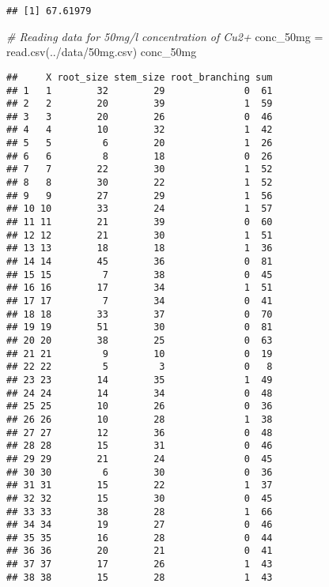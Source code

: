 \documentclass[
]{article}
\newenvironment{Shaded}{\begin{snugshade}}{\end{snugshade}}
\newcommand{\CommentTok}[1]{\textcolor[rgb]{0.56,0.35,0.01}{\textit{#1}}}
\newcommand{\FunctionTok}[1]{\textcolor[rgb]{0.00,0.00,0.00}{#1}}
\newcommand{\NormalTok}[1]{#1}
\newcommand{\OtherTok}[1]{\textcolor[rgb]{0.56,0.35,0.01}{#1}}
\newcommand{\StringTok}[1]{\textcolor[rgb]{0.31,0.60,0.02}{#1}}
\begin{document}
\begin{verbatim}
## [1] 67.61979
\end{verbatim}

\begin{Shaded}
\begin{Highlighting}[]
\CommentTok{\# Reading data for 50mg/l concentration of Cu2+}
\NormalTok{conc\_50mg }\OtherTok{=} \FunctionTok{read.csv}\NormalTok{(}\StringTok{\textquotesingle{}../data/50mg.csv\textquotesingle{}}\NormalTok{)}
\NormalTok{conc\_50mg}
\end{Highlighting}
\end{Shaded}

\begin{verbatim}
##     X root_size stem_size root_branching sum
## 1   1        32        29              0  61
## 2   2        20        39              1  59
## 3   3        20        26              0  46
## 4   4        10        32              1  42
## 5   5         6        20              1  26
## 6   6         8        18              0  26
## 7   7        22        30              1  52
## 8   8        30        22              1  52
## 9   9        27        29              1  56
## 10 10        33        24              1  57
## 11 11        21        39              0  60
## 12 12        21        30              1  51
## 13 13        18        18              1  36
## 14 14        45        36              0  81
## 15 15         7        38              0  45
## 16 16        17        34              1  51
## 17 17         7        34              0  41
## 18 18        33        37              0  70
## 19 19        51        30              0  81
## 20 20        38        25              0  63
## 21 21         9        10              0  19
## 22 22         5         3              0   8
## 23 23        14        35              1  49
## 24 24        14        34              0  48
## 25 25        10        26              0  36
## 26 26        10        28              1  38
## 27 27        12        36              0  48
## 28 28        15        31              0  46
## 29 29        21        24              0  45
## 30 30         6        30              0  36
## 31 31        15        22              1  37
## 32 32        15        30              0  45
## 33 33        38        28              1  66
## 34 34        19        27              0  46
## 35 35        16        28              0  44
## 36 36        20        21              0  41
## 37 37        17        26              1  43
## 38 38        15        28              1  43

\end{verbatim}
\end{document}
